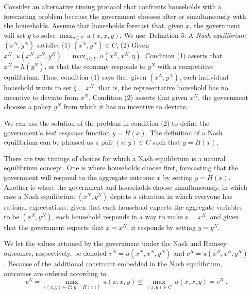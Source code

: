 Consider an alternative timing protocol that confronts  households with  a
forecasting problem because the government chooses after or simultaneously
with the households.   Assume that households forecast that, given $x$, the government
will set $y$ to solve $\max_{y\in Y}\, u(x,x,y)$.  We use:
\medskip\noindent
{\sc Definition 5:}  A {\it Nash equilibrium} $(x^N, y^N)$ satisfies
\smallskip
\noindent (1) $(x^N,y^N)\in C$;
\smallskip
\noindent (2) Given $x^N,\, u(x^N,x^N,y^N)=\max_{\eta\in Y}\,
u(x^N,x^N,\eta)$.
\medskip\noindent
Condition (1) asserts that $x^N = h(y^N)$, or that the economy responds
to $y^N$ with a competitive equilibrium.  Thus,
condition  (1) says that given $(x^N, y^N)$, each
individual household wants to set $\xi=x^N$; that is, the representative household
has no incentive to deviate from $x^N$.  Condition (2) asserts that
given $x^N$, the government chooses a policy $y^N$ from which it has no
incentive to deviate.

We can use the solution of the problem in condition (2) to define
the government's {\it best response\/} function $y=H(x)$.
The definition  of a Nash equilibrium can be phrased
as a pair $(x,y) \in C$ such that $y=H(x)$.


There are two timings of choices for which a Nash equilibrium
is a natural equilibrium concept.  One is where
households choose first, forecasting that the government will
respond to the aggregate outcome $x$ by setting $y=H(x)$.  Another
is where the government and households choose simultaneously,
in which case a Nash equilibrium $(x^N,y^N)$ depicts a situation
in which everyone has rational expectations:  given that
each household expects the aggregate variables to be $(x^N,y^N)$,
each household responds in a way to make $x=x^N$, and given that
the government expects that $x=x^N$, it responds by setting $y=y^N$.

We let the values attained by the government under the Nash and Ramsey outcomes, respectively, be denoted $v^N = u(x^N,x^N,y^N)$ and $v^R= u(x^R,x^R,y^R)$.
Because of the additional constraint
embedded in the Nash equilibrium, outcomes are ordered according to
$$v^N = \max_{\{(x,y)\in C:\, y=H(x)\}}\, u(x,x,y)
      \leq \max_{(x,y)\in C}\, u(x,x,y) = v^R\ .$$

